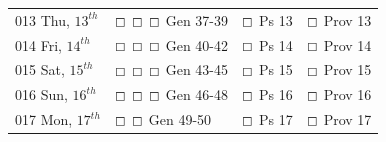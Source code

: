\documentclass[10pt,landscape,twocolumn,letterpaper]{article}
\begin{document}
\begin{tabular}{p{0.8in}p{1.3in}p{1.2in}p{1.2in}}
\tiny 013 \normalsize Thu, $13^{th}$ &  $\boxempty$ $\boxempty$ $\boxempty$ \hspace{.05in} \textcolor[rgb]{1.00,0.00,0.00}{Gen 37-39} &  $\boxempty$ \hspace{.05in} \textcolor[rgb]{0.00,1.00,0.00}{Ps 13} &  $\boxempty$ \hspace{.05in} \textcolor[rgb]{0.00,0.00,1.00}{Prov 13}  \\

\tiny 014 \normalsize Fri, $14^{th}$ &  $\boxempty$ $\boxempty$ $\boxempty$ \hspace{.05in} \textcolor[rgb]{1.00,0.00,0.00}{Gen 40-42} &  $\boxempty$ \hspace{.05in} \textcolor[rgb]{0.00,1.00,0.00}{Ps 14} &  $\boxempty$ \hspace{.05in} \textcolor[rgb]{0.00,0.00,1.00}{Prov 14}  \\

\tiny 015 \normalsize Sat, $15^{th}$ &   $\boxempty$ $\boxempty$ $\boxempty$ \hspace{.05in} \textcolor[rgb]{1.00,0.00,0.00}{Gen 43-45} & $\boxempty$ \hspace{.05in} \textcolor[rgb]{0.00,1.00,0.00}{Ps 15} & $\boxempty$ \hspace{.05in} \textcolor[rgb]{0.00,0.00,1.00}{Prov 15}  \\

\tiny 016 \normalsize Sun, $16^{th}$ &   $\boxempty$ $\boxempty$ $\boxempty$ \hspace{.05in} \textcolor[rgb]{1.00,0.00,0.00}{Gen 46-48} & $\boxempty$ \hspace{.05in} \textcolor[rgb]{0.00,1.00,0.00}{Ps 16} & $\boxempty$ \hspace{.05in} \textcolor[rgb]{0.00,0.00,1.00}{Prov 16}  \\

\tiny 017 \normalsize Mon, $17^{th}$ &   $\boxempty$ $\boxempty$  \hspace{.20in} \textcolor[rgb]{1.00,0.00,0.00}{Gen 49-50} & $\boxempty$ \hspace{.05in} \textcolor[rgb]{0.00,1.00,0.00}{Ps 17} & $\boxempty$ \hspace{.05in} \textcolor[rgb]{0.00,0.00,1.00}{Prov 17}  \\

\end{tabular} 
\newpage
\end{document}
